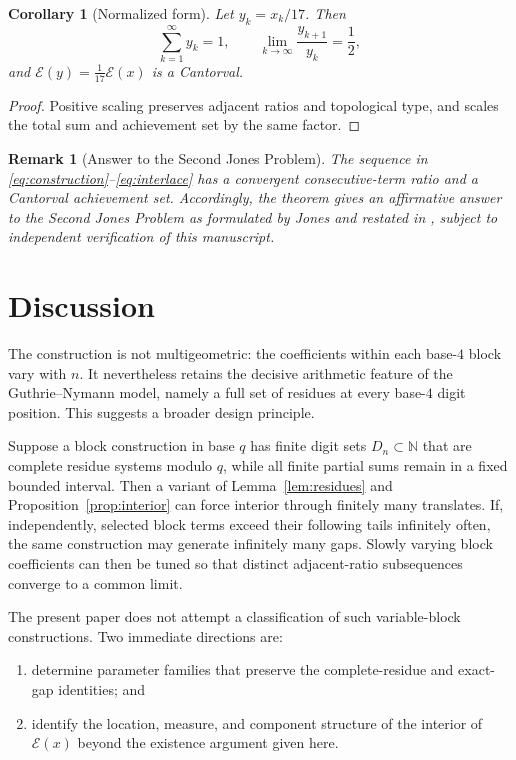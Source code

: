 \documentclass[11pt,letterpaper]{article}
\theoremstyle{metriqthm}
\newtheorem{corollary}[theorem]{Corollary}
\theoremstyle{metriqdef}
\newtheorem{remark}[theorem]{Remark}
\newcommand{\E}{\mathcal{E}}
\newcommand{\N}{\mathbb{N}}
\begin{document}
\begin{corollary}[Normalized form]\label{cor:normalized}
Let $y_k=x_k/17$. Then
\[
  \sum_{k=1}^{\infty}y_k=1,
  \qquad
  \lim_{k\to\infty}\frac{y_{k+1}}{y_k}=\frac12,
\]
and $\E(y)=\frac1{17}\E(x)$ is a Cantorval.
\end{corollary}

\begin{proof}
Positive scaling preserves adjacent ratios and topological type, and scales the total sum and achievement set by the same factor.
\end{proof}

\begin{remark}[Answer to the Second Jones Problem]
The sequence in \eqref{eq:construction}--\eqref{eq:interlace} has a convergent consecutive-term ratio and a Cantorval achievement set. Accordingly, the theorem gives an affirmative answer to the Second Jones Problem as formulated by Jones \cite[p.~519]{Jones2011} and restated in \cite[Problem~4]{GlabPrus2025}, subject to independent verification of this manuscript.
\end{remark}

\section{Discussion}

The construction is not multigeometric: the coefficients within each base-$4$ block vary with $n$. It nevertheless retains the decisive arithmetic feature of the Guthrie--Nymann model, namely a full set of residues at every base-$4$ digit position. This suggests a broader design principle.

Suppose a block construction in base $q$ has finite digit sets $D_n\subset\N$ that are complete residue systems modulo $q$, while all finite partial sums remain in a fixed bounded interval. Then a variant of Lemma~\ref{lem:residues} and Proposition~\ref{prop:interior} can force interior through finitely many translates. If, independently, selected block terms exceed their following tails infinitely often, the same construction may generate infinitely many gaps. Slowly varying block coefficients can then be tuned so that distinct adjacent-ratio subsequences converge to a common limit.

The present paper does not attempt a classification of such variable-block constructions. Two immediate directions are:
\begin{enumerate}[leftmargin=1.6em,itemsep=0.25em,topsep=0.4em]
  \item determine parameter families that preserve the complete-residue and exact-gap identities; and
  \item identify the location, measure, and component structure of the interior of $\E(x)$ beyond the existence argument given here.
\end{enumerate}
\end{document}
